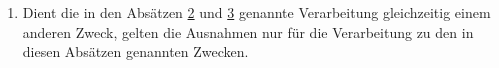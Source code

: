 \begin{enumerate}
  \item Dient die in den Absätzen \hyperref[itm:89-2]{2} und \hyperref[itm:89-3]{3} genannte Verarbeitung gleichzeitig
   einem anderen Zweck, gelten die Ausnahmen nur für die Verarbeitung zu den in diesen Absätzen genannten Zwecken.
  \label{itm:89-4}

\end{enumerate}


